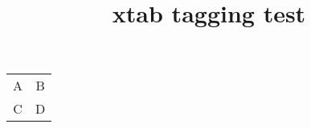 \documentclass{article}
\title{xtab tagging test}
\begin{document}
\begin{xtabular}{cc}
A & B \\
C & D
\end{xtabular}
\end{document}
